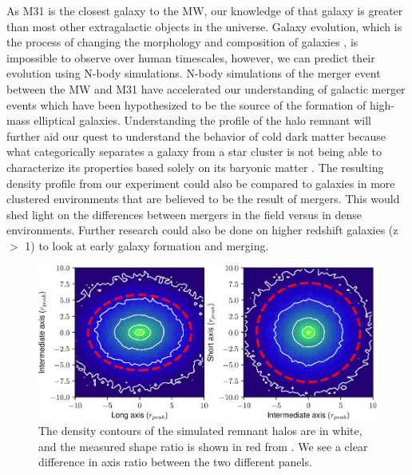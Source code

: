 \documentclass[linenumbers, twocolumn]{aastex631}
\begin{document}
As M31 is the closest galaxy to the MW, our knowledge of that galaxy is greater than most other extragalactic objects in the universe. Galaxy evolution, which is the process of changing the morphology and composition of galaxies \citep{2004galaxyevolutiondef}, is impossible to observe over human timescales, however, we can predict their evolution using N-body simulations.
N-body simulations of the merger event between the MW and M31 have accelerated our understanding of galactic merger events which have been hypothesized to be the source of the formation of high-mass elliptical galaxies. 
Understanding the profile of the halo remnant will further aid our quest to understand the behavior of cold dark matter because what categorically separates a galaxy from a star cluster is not being able to characterize its properties based solely on its baryonic matter \citep{2012Galaxydef}.
The resulting density profile from our experiment could also be compared to galaxies in more clustered environments that are believed to be the result of mergers. This would shed light on the differences between mergers in the field versus in dense environments.
Further research could also be done on higher redshift galaxies (z $>$ 1) to look at early galaxy formation and merging.
\begin{figure}[ht]
    \centering
    \includegraphics[scale=0.5]{figures/drakos_fig_6.png}
    \caption{The density contours of the simulated remnant halos are in white, and the measured shape ratio is shown in red from \cite{2019drakos}. We see a clear difference in axis ratio between the two different panels.}
    \label{fig:drakos}
\end{figure}
\end{document}
